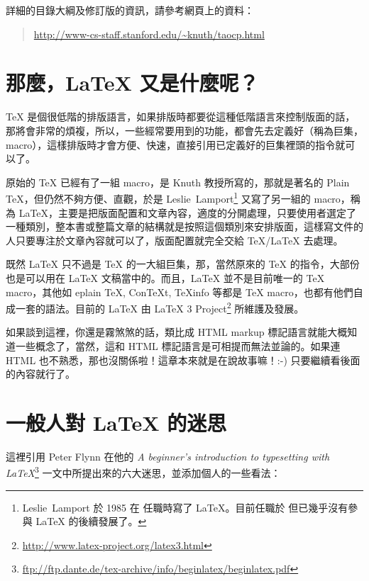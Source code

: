 詳細的目錄大綱及修訂版的資訊，請參考網頁上的資料：

\begin{quote}
  \url{http://www-cs-staff.stanford.edu/~knuth/taocp.html}
\end{quote}

\section{那麼，\LaTeX{} 又是什麼呢？}

\TeX{} 是個很低階的排版語言，如果排版時都要從這種低階語言來控制版面的話，那將會非常的煩複，所以，一些經常要用到的功能，都會先去定義好（稱為巨集，macro），這樣排版時才會方便、快速，直接引用已定義好的巨集裡頭的指令就可以了。

原始的 \TeX{} 已經有了一組 macro，是 Knuth 教授所寫的，那就是著名的 Plain \TeX{}，但仍然不夠方便、直觀，於是
Leslie~Lamport\footnote{Leslie~Lamport 於 1985 在
任職時寫了 \LaTeX{}。目前任職於
但已幾乎沒有參與 \LaTeX{} 的後續發展了。}
又寫了另一組的 macro，稱為 \LaTeX{}，主要是把版面配置和文章內容，適度的分開處理，只要使用者選定了一種類別，整本書或整篇文章的結構就是按照這個類別來安排版面，這樣寫文件的人只要專注於文章內容就可以了，版面配置就完全交給 \TeX{}/\LaTeX{} 去處理。

既然 \LaTeX{} 只不過是 \TeX{} 的一大組巨集，那，當然原來的 \TeX{} 的指令，大部份也是可以用在 \LaTeX{} 文稿當中的。而且，\LaTeX{} 並不是目前唯一的 \TeX{} macro，其他如 eplain \TeX{}, Con\TeX{}t, \TeX{}info 等都是 \TeX{} macro，也都有他們自成一套的語法。目前的 \LaTeX{} 由
\LaTeX{} 3 Project\footnote{\url{http://www.latex-project.org/latex3.html}}
所維護及發展。

如果談到這裡，你還是霧煞煞的話，類比成 HTML markup 標記語言就能大概知道一些概念了，當然，這和 HTML 標記語言是可相提而無法並論的。如果連 HTML 也不熟悉，那也沒關係啦！這章本來就是在說故事嘛！:-) 只要繼續看後面的內容就行了。

\section{一般人對 \LaTeX{} 的迷思}

這裡引用 Peter Flynn 在他的
\textit{A beginner's introduction to typesetting with \LaTeX{}}\footnote{\url{ftp://ftp.dante.de/tex-archive/info/beginlatex/beginlatex.pdf}}
一文中所提出來的六大迷思，並添加個人的一些看法：

